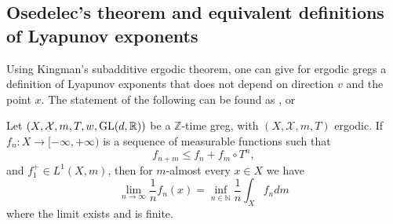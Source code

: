 \documentclass{report}
\begin{document}
\subsection{Osedelec's theorem and equivalent definitions of Lyapunov exponents}
Using Kingman's subadditive ergodic theorem, one can give for ergodic gregs a definition of Lyapunov exponents that does not depend on direction $v$ and the point $x$.
The statement of the following can be found as \cite[Theorem 4.3]{duarte2016lyapunov}, or \cite[Theorem 5.17]{bader2025lyapunov}
\begin{theorem}\label{thm:kingman}
Let $(X, \mathcal X, m, T, w, \operatorname{{\mathrm{GL}}}(d,\mathbb R))$ be a $\mathbb Z$-time greg, with $(X, \mathcal X, m, T)$ ergodic.
If $f_n: X \to [-\infty, +\infty)$ is a sequence of measurable functions such that
\[
f_{n+m} \leq f_n + f_m \circ T^n,
\]
and $f_1^+ \in L^1(X, m)$, then for $m$-almost every $x \in X$ we have
\[
\lim_{n \to \infty} \frac{1}{n} f_n(x) = \inf_{n \in \mathbb N} \frac{1}{n} \int_X f_n dm
\]
where the limit exists and is finite.
\end{theorem}
\end{document}
